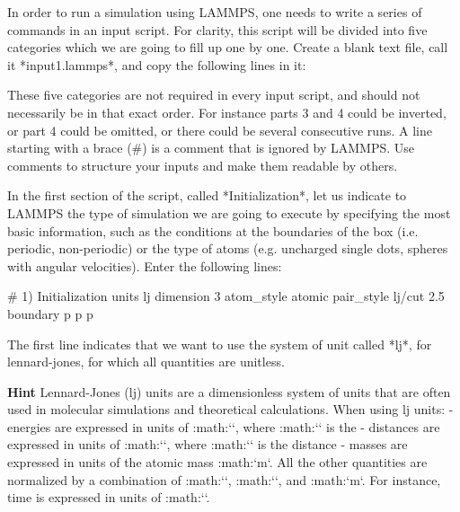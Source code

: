 In order to run a simulation using LAMMPS, one needs to
write a series of commands in an input script. For clarity,
this script will be divided into five categories which we are going to
fill up one by one. Create a blank text file, call it
*input1.lammps*, and copy the following lines in it:



\begin{lcverbatim}
\end{lcverbatim}

These five categories are not required in every
input script, and should not necessarily be in that
exact order. For instance parts 3 and 4 could be inverted, or
part 4 could be omitted, or there could be several
consecutive runs.
A line starting with a brace (#) is a comment
that is ignored by LAMMPS. Use comments to structure 
your inputs and make them readable by others.








In the first section of the script, called *Initialization*,
let us indicate to LAMMPS the type of simulation we are
going to execute by specifying the most basic information,
such as the conditions at the boundaries of the box (i.e.
periodic, non-periodic) or the type of atoms (e.g. uncharged
single dots, spheres with angular velocities). Enter the
following lines:



\begin{lcverbatim}
# 1) Initialization
units lj
dimension 3
atom_style atomic
pair_style lj/cut 2.5
boundary p p p
\end{lcverbatim}

The first line indicates that we want to
use the system of unit called *lj*, for lennard-jones, for which all quantities
are unitless. 



\textbf{Hint} Lennard-Jones (lj) units are a dimensionless system of units that are often used in molecular simulations
and theoretical calculations. When using lj units:
- energies are expressed in units of :math:`\epsilon`, where :math:`\epsilon` is the
- distances are expressed in units of :math:`\sigma`, where :math:`\sigma` is the distance
- masses are expressed in units of the atomic mass :math:`m`.
All the other quantities are normalized by a combination of :math:`\epsilon`, :math:`\sigma`,
and :math:`m`. For instance, time is expressed in units of :math:``. 


